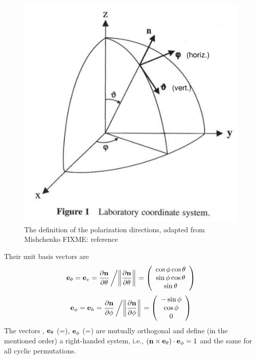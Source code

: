 \begin{figure}[!ht]
 \begin{center}
  \begin{minipage}[c]{0.9\textwidth}
   \begin{center}
    \includegraphics*[width=0.9\hsize]{Figs/polarization/pol_directions}
   \end{center}
  \end{minipage}
  \begin{minipage}[c]{0.9\textwidth}
   \caption{The definition of the polarization directions, adapted
     from Mishchenko FIXME: reference}
   \label{fig:polarization:directions}
  \end{minipage}
 \end{center}
\end{figure}   
%
Their unit basis vectors are
\begin{equation}
  \label{eq:polarization:etheta}
   \VctStl{e}_\theta = \eVrt =
    \PrtDrv{\VctStl{n}}{\theta} \left/ 
     \left\| \PrtDrv{\VctStl{n}}{\theta}\right\| \right.  
    =
    \ColVct{\cos\phi \cos\theta}%
           {\sin\phi \cos\theta}%
           { \sin\theta}
\end{equation}
%
\begin{equation}
  \label{eq:polarization:ephi}
   \VctStl{e}_\phi = \eHor = 
    \PrtDrv{\VctStl{n}}{\phi} \left/ 
          \left\|\PrtDrv{\VctStl{n}}{\phi}\right\| \right.  
    =
    \ColVct{-\sin\phi}%
           {\cos\phi}%
           { 0}
\end{equation}
The vectors , $\mathbf{e}_\theta$ (=\eVrt),
$\mathbf{e}_\phi$ (=\eHor) are
mutually orthogonal and define (in the mentioned order) a right-handed
system, i.e., 
$\left(\mathbf{n}\times \mathbf{e}_\theta\right) \cdot
\mathbf{e}_\phi = 1$ and the same for all cyclic permutations.


